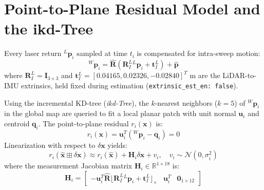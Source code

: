 \documentclass[11pt,a4paper]{report}
\begin{document}
\section{Point-to-Plane Residual Model and the ikd-Tree}
Every laser return ${}^L \mathbf{p}_i$ sampled at time $t_i$ is compensated for intra-sweep motion:
\begin{equation}
    {}^W \mathbf{p}_i = \hat{\mathbf{R}} \left( \mathbf{R}_I^L {}^L \mathbf{p}_i + \mathbf{t}_I^L \right) + \hat{\mathbf{p}}
\end{equation}
where $\mathbf{R}_I^L = \mathbf{I}_{3 \times 3}$ and $\mathbf{t}_I^L = [0.04165, 0.02326, -0.02840]^T\text{ m}$ are the LiDAR-to-IMU extrinsics, held fixed during estimation (\texttt{extrinsic\_est\_en: false}).

Using the incremental KD-tree (\textit{ikd-Tree}), the $k$-nearest neighbors ($k=5$) of ${}^W \mathbf{p}_i$ in the global map are queried to fit a local planar patch with unit normal $\mathbf{u}_i$ and centroid $\mathbf{q}_i$. The point-to-plane residual $r_i(\mathbf{x})$ is:
\begin{equation}
    r_i(\mathbf{x}) = \mathbf{u}_i^T \left( {}^W \mathbf{p}_i - \mathbf{q}_i \right) = 0
\end{equation}
Linearization with respect to $\delta \mathbf{x}$ yields:
\begin{equation}
    r_i(\hat{\mathbf{x}} \boxplus \delta \mathbf{x}) \approx r_i(\hat{\mathbf{x}}) + \mathbf{H}_i \delta \mathbf{x} + v_i, \quad v_i \sim \mathcal{N}(0, \sigma_i^2)
\end{equation}
where the measurement Jacobian matrix $\mathbf{H}_i \in \mathbb{R}^{1 \times 18}$ is:
\begin{equation}
    \mathbf{H}_i = \begin{bmatrix}
        -\mathbf{u}_i^T \hat{\mathbf{R}} \lfloor \mathbf{R}_I^L {}^L \mathbf{p}_i + \mathbf{t}_I^L \rfloor_\times & \mathbf{u}_i^T & \mathbf{0}_{1 \times 12}
    \end{bmatrix}
\end{equation}
\end{document}
